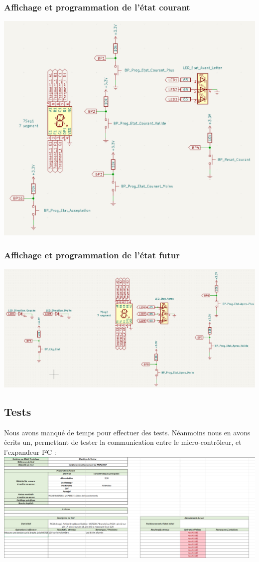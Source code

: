 \documentclass[12pt]{report}
\begin{document}
	\subsubsection{Affichage et programmation de l'état courant}
	\includegraphics[width=\textwidth]{img/st_etat_courant}
	\subsubsection{Affichage et programmation de l'état futur}
	\includegraphics[width=\textwidth]{img/st_etat_futur}
	\subsection{Tests}
	Nous avons manqué de temps pour effectuer des tests. Néanmoins nous en avons écrits un, permettant de tester la communication entre le micro-contrôleur, et l'expandeur I²C :\\
	\includegraphics[width=\textwidth]{img/test}
\end{document}
